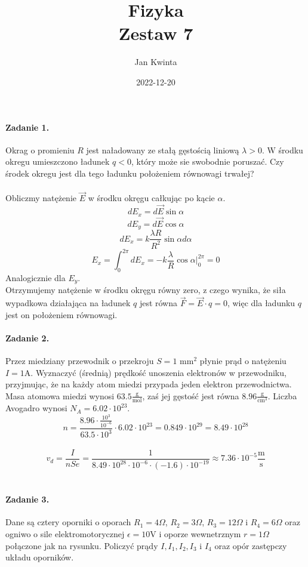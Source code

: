 \documentclass[14pt, table]{extarticle}
\title{Fizyka \\ \Large{Zestaw 7}}
\author{Jan Kwinta}
\date{2022-12-20}
\newcommand{\gram}{\textrm{g}}
\newcommand{\wolt}{\textrm{V}}
\newcommand{\ohm}{\Omega}
\begin{document}
\maketitle

\paragraph{Zadanie 1.}
Okrag o promieniu $R$ jest naładowany ze stałą gęstością liniową $\lambda > 0$. W środku okregu umieszczono ładunek $q < 0$, który może sie swobodnie poruszać. Czy środek okregu jest dla tego ładunku położeniem równowagi trwałej? \\ \\
Obliczmy natężenie $\vec{E}$ w środku okręgu całkując po kącie $\alpha$.
$$ dE_x = d\vec{E} \sin{\alpha} $$
$$ dE_y = d\vec{E} \cos{\alpha} $$
$$ dE_x = k \frac{\lambda R}{R^2} \sin{\alpha} d\alpha $$
$$ E_x = \int_0^{2\pi} dE_x = -k \frac{\lambda}{R} \cos{\alpha} \bigg|_{0}^{2\pi} = 0 $$
Analogicznie dla $E_y$. \\
Otrzymujemy natężenie w środku okręgu równy zero, z czego wynika, że siła wypadkowa działająca na ładunek $q$ jest równa $\vec{F} = \vec{E} \cdot q = 0$, więc dla ładunku $q$ jest on położeniem równowagi.


\newpage
\paragraph{Zadanie 2.}
Przez miedziany przewodnik o przekroju $S = 1$ mm$^2$ płynie prąd o natężeniu $I = 1$A. Wyznaczyć (średnią) prędkość unoszenia elektronów w przewodniku, przyjmując, że na każdy atom miedzi przypada jeden elektron przewodnictwa. Masa atomowa miedzi wynosi $63.5 \frac{\gram}{\textrm{mol}}$, zaś jej gęstość jest równa $8.96 \frac{\gram}{\textrm{cm}^3}$. Liczba Avogadro wynosi $N_A = 6.02 \cdot 10^{23}.$ \\

$$ n = \frac{8.96 \cdot \frac{10^3}{10^{-6}}}{63.5 \cdot 10^3} \cdot 6.02 \cdot 10^{23} = 0.849 \cdot 10^{29} = 8.49 \cdot 10^{28} $$ \\
$$ v_d = \frac{I}{nSe} = \frac{1}{8.49 \cdot 10^{28}  \cdot 10^{-6} \cdot (-1.6) \cdot 10^{-19}} \approx 7.36 \cdot 10^{-5} \frac{\textrm{m}}{\textrm{s}} $$ \\


\newpage
\paragraph{Zadanie 3.}
Dane są cztery oporniki o oporach $R_1 = 4\ohm$, $R_2 = 3\ohm$, $R_3 = 12\ohm$ i $R_4 = 6\ohm$ oraz ogniwo o sile elektromotorycznej $\epsilon = 10 \wolt$ i oporze wewnetrznym $r = 1\ohm$ połączone jak na rysunku. Policzyć prądy $I, I_1, I_2, I_3$ i $I_4$ oraz opór zastępczy układu oporników.
\end{document}
